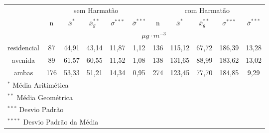 \begin{tabular}{cccccc|ccccc}
  \hline
  &  \multicolumn{5}{c|}{sem Harmatão} & \multicolumn{5}{c}{com Harmatão} \\
 & n & $\overline{x}^*$ & $\overline{x}_g^{**}$ & $\sigma^{***}$ & $\overline{\sigma}^{***}$
 & n & $\overline{x}^*$ & $\overline{x}_g^{**}$ & $\sigma^{***}$ & $\overline{\sigma}^{***}$ \\
                       \hline & \multicolumn{10}{c}{$\mu g \cdot m^{-3}$} \\  \hline
residencial & 87 & 44,91 & 43,14 & 11,87 & 1,12 & 136 & 115,12 & 67,72 & 186,39 & 13,28 \\ 
  avenida & 89 & 61,57 & 60,55 & 11,52 & 1,08 & 138 & 131,65 & 88,99 & 183,62 & 13,02 \\ 
  ambas & 176 & 53,33 & 51,21 & 14,34 & 0,95 & 274 & 123,45 & 77,70 & 184,85 & 9,29 \\ 
   \hline
\multicolumn{11}{l}{$^{*}$ Média Aritimética} \\
\multicolumn{11}{l}{$^{**}$ Média Geométrica} \\
\multicolumn{11}{l}{$^{***}$ Desvio Padrão} \\
\multicolumn{11}{l}{$^{****}$ Desvio Padrão da Média} \\
   \hline
\end{tabular}
